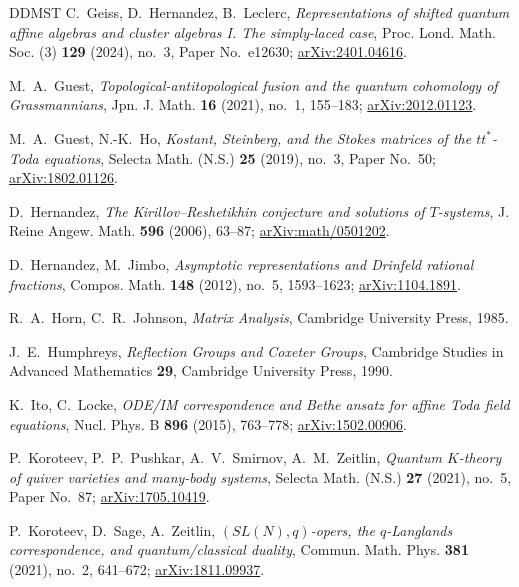 \documentclass[11pt,leqno]{amsart}
\numberwithin{equation}{section}
\theoremstyle{plain}
\theoremstyle{definition}
\theoremstyle{plain}
\theoremstyle{definition}
\theoremstyle{remark}
\begin{document}
\begin{thebibliography}{DDMST}
C.~Geiss, D.~Hernandez, B.~Leclerc,
\emph{Representations of shifted quantum affine algebras and cluster algebras I. The simply-laced case},
Proc. Lond. Math. Soc. (3) \textbf{129} (2024), no.~3, Paper No.~e12630; \href{https://arxiv.org/abs/2401.04616}{arXiv:2401.04616}.

M.~A.~Guest,
\emph{Topological-antitopological fusion and the quantum cohomology of Grassmannians},
Jpn. J. Math. \textbf{16} (2021), no.~1, 155--183; \href{https://arxiv.org/abs/2012.01123}{arXiv:2012.01123}.

M.~A.~Guest, N.-K.~Ho,
\emph{Kostant, Steinberg, and the Stokes matrices of the $tt^*$-Toda equations},
Selecta Math. (N.S.) \textbf{25} (2019), no.~3, Paper No.~50; \href{https://arxiv.org/abs/1802.01126}{arXiv:1802.01126}.

D.~Hernandez,
\emph{The Kirillov--Reshetikhin conjecture and solutions of $T$-systems},
J. Reine Angew. Math. \textbf{596} (2006), 63--87; \href{https://arxiv.org/abs/math/0501202}{arXiv:math/0501202}.

D.~Hernandez, M.~Jimbo,
\emph{Asymptotic representations and Drinfeld rational fractions},
Compos. Math. \textbf{148} (2012), no.~5, 1593--1623; \href{https://arxiv.org/abs/1104.1891}{arXiv:1104.1891}.

R.~A.~Horn, C.~R.~Johnson,
\emph{Matrix Analysis},
Cambridge University Press, 1985.

J.~E.~Humphreys,
\emph{Reflection Groups and Coxeter Groups},
Cambridge Studies in Advanced Mathematics \textbf{29},
Cambridge University Press, 1990.

K.~Ito, C.~Locke,
\emph{ODE/IM correspondence and Bethe ansatz for affine Toda field equations},
Nucl. Phys. B \textbf{896} (2015), 763--778; \href{https://arxiv.org/abs/1502.00906}{arXiv:1502.00906}.

P.~Koroteev, P.~P.~Pushkar, A.~V.~Smirnov, A.~M.~Zeitlin,
\emph{Quantum $K$-theory of quiver varieties and many-body systems},
Selecta Math. (N.S.) \textbf{27} (2021), no.~5, Paper No.~87;
\href{https://arxiv.org/abs/1705.10419}{arXiv:1705.10419}.

P.~Koroteev, D.~Sage, A.~Zeitlin,
\emph{$(SL(N),q)$-opers, the $q$-Langlands correspondence, and quantum/classical duality},
Commun. Math. Phys. \textbf{381} (2021), no.~2, 641--672; \href{https://arxiv.org/abs/1811.09937}{arXiv:1811.09937}.


\end{thebibliography}
\end{document}
